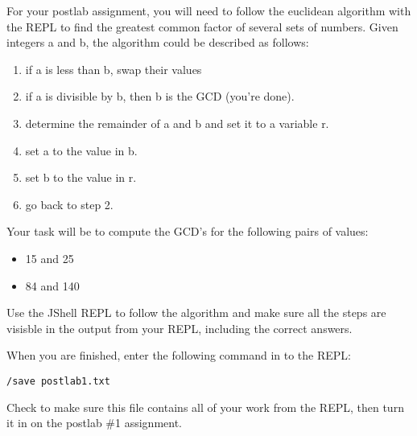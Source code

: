 
For your postlab assignment, you will need to follow the euclidean algorithm with 
the REPL to find the greatest common factor of several sets of numbers. Given 
integers a and b, the algorithm could be described as follows:

\begin{enumerate}
\item if a is less than b, swap their values
\item if a is divisible by b, then b is the GCD (you're done). 
\item determine the remainder of a and b and set it to a variable r.
\item set a to the value in b.
\item set b to the value in r.
\item go back to step 2.
\end{enumerate}

Your task will be to compute the GCD's for the following pairs of values:
\begin{itemize}
\item 15 and 25
\item 84 and 140
\end{itemize}

Use the JShell REPL to follow the algorithm and make sure all the steps are visisble in the output from your REPL, including the correct answers. 

When you are finished, enter the following command in to the REPL:

\begin{verbatim}
/save postlab1.txt
\end{verbatim}

Check to make sure this file contains all of your work from the REPL, then 
turn it in on the postlab \#1 assignment. 